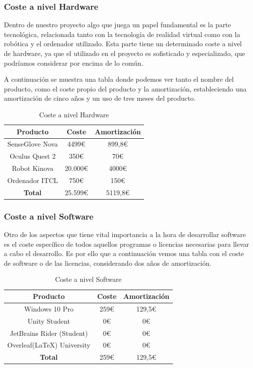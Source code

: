 \newpage
\subsubsection{Coste a nivel Hardware}
Dentro de nuestro proyecto algo que juega un papel fundamental es la parte tecnológica, relacionada tanto con la tecnología de realidad virtual\cite{VR} como con la robótica\cite{Robotica} y el ordenador utilizado. Esta parte tiene un determinado coste a nivel de hardware, ya que el utilizado en el proyecto es sofisticado y especializado, que podríamos considerar por encima de lo común.

A continuación se muestra una tabla donde podemos ver tanto el nombre del producto, como el coste propio del producto y la amortización, estableciendo una amortización de cinco años y un uso de tres meses del producto.

\begin{table}[h]
    \centering
    \begin{tabular}{c| c |c}
    \hline
        Producto & Coste & Amortización \\ \hline
        SenseGlove Nova & 4499€ & 899,8€ \\
        Oculus Quest 2 & 350€ & 70€ \\
        Robot Kinova & 20.000€ & 4000€  \\
        Ordenador ITCL & 750€ & 150€ \\ \hline
        \textbf{Total} & 25.599€ & 5119,8€ \\ \hline
    \end{tabular}
    \caption{Coste a nivel Hardware}
    \label{Coste a nivel Hardware}
\end{table}

\subsubsection{Coste a nivel Software}
Otro de los aspectos que tiene vital importancia a la hora de desarrollar software es el coste específico de todos aquellos programas o licencias necesarias para llevar a cabo el desarrollo. Es por ello que a continuación vemos una tabla con el coste de software o de las licencias, considerando dos años de amortización.

\begin{table}[h]
    \centering
    \begin{tabular}{c|c|c}
    \hline
        Producto & Coste & Amortización \\ \hline
         Windows 10 Pro & 259€ & 129,5€ \\ 
         Unity Student & 0€ & 0€ \\ 
         JetBrains Rider (Student) & 0€ & 0€ \\ 
         Overleaf(\LaTeX) University & 0€ & 0€ \\ \hline
         \textbf{Total} & 259€ & 129,5€ \\ \hline
    \end{tabular}
    \caption{Coste a nivel Software}
    \label{Coste a nivel Software}
\end{table}

